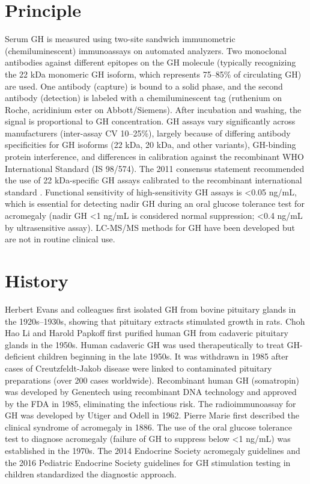 \section*{Principle}
Serum GH is measured using two-site sandwich immunometric (chemiluminescent) immunoassays on automated analyzers. Two monoclonal antibodies against different epitopes on the GH molecule (typically recognizing the 22 kDa monomeric GH isoform, which represents 75--85\% of circulating GH) are used. One antibody (capture) is bound to a solid phase, and the second antibody (detection) is labeled with a chemiluminescent tag (ruthenium on Roche, acridinium ester on Abbott/Siemens). After incubation and washing, the signal is proportional to GH concentration. GH assays vary significantly across manufacturers (inter-assay CV 10--25\%), largely because of differing antibody specificities for GH isoforms (22 kDa, 20 kDa, and other variants), GH-binding protein interference, and differences in calibration against the recombinant WHO International Standard (IS 98/574). The 2011 consensus statement recommended the use of 22 kDa-specific GH assays calibrated to the recombinant international standard \cite{clemmons2011consensus}. Functional sensitivity of high-sensitivity GH assays is <0.05 ng/mL, which is essential for detecting nadir GH during an oral glucose tolerance test for acromegaly (nadir GH <1 ng/mL is considered normal suppression; <0.4 ng/mL by ultrasensitive assay). LC-MS/MS methods for GH have been developed but are not in routine clinical use.

\section*{History}
Herbert Evans and colleagues first isolated GH from bovine pituitary glands in the 1920s--1930s, showing that pituitary extracts stimulated growth in rats. Choh Hao Li and Harold Papkoff first purified human GH from cadaveric pituitary glands in the 1950s. Human cadaveric GH was used therapeutically to treat GH-deficient children beginning in the late 1950s. It was withdrawn in 1985 after cases of Creutzfeldt-Jakob disease were linked to contaminated pituitary preparations (over 200 cases worldwide). Recombinant human GH (somatropin) was developed by Genentech using recombinant DNA technology and approved by the FDA in 1985, eliminating the infectious risk. The radioimmunoassay for GH was developed by Utiger and Odell in 1962. Pierre Marie first described the clinical syndrome of acromegaly in 1886. The use of the oral glucose tolerance test to diagnose acromegaly (failure of GH to suppress below <1 ng/mL) was established in the 1970s. The 2014 Endocrine Society acromegaly guidelines \cite{katznelson2014acromegaly} and the 2016 Pediatric Endocrine Society guidelines for GH stimulation testing in children \cite{grimberg2016guidelines} standardized the diagnostic approach.

